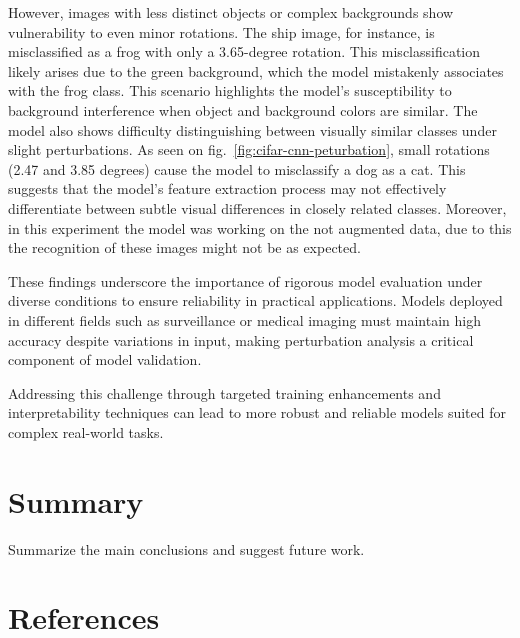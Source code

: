 \documentclass[journal, a4paper]{IEEEtran}
\begin{document}
However, images with less distinct objects or complex backgrounds show vulnerability to even minor rotations.
The ship image, for instance, is misclassified as a frog with only a 3.65-degree rotation.
This misclassification likely arises due to the green background, which the model mistakenly associates with the frog class.
This scenario highlights the model's susceptibility to background interference when object and background colors are similar.
The model also shows difficulty distinguishing between visually similar classes under slight perturbations.
As seen on fig.~\ref{fig:cifar-cnn-peturbation}, small rotations (2.47 and 3.85 degrees) cause the model to misclassify a dog as a cat.
This suggests that the model's feature extraction process may not effectively differentiate between subtle visual differences in closely related classes.
Moreover, in this experiment the model was working on the not augmented data, due to this the recognition of these images might not be as expected.

These findings underscore the importance of rigorous model evaluation under diverse conditions to ensure reliability in practical applications.
Models deployed in different fields such as surveillance or medical imaging must maintain high accuracy despite variations in input, making perturbation analysis a critical component of model validation.

Addressing this challenge through targeted training enhancements and interpretability techniques can lead to more robust and reliable models suited for complex real-world tasks.

\section{Summary}\label{sec:summary}
Summarize the main conclusions and suggest future work.

\section{References}\label{sec:references}



\end{document}
